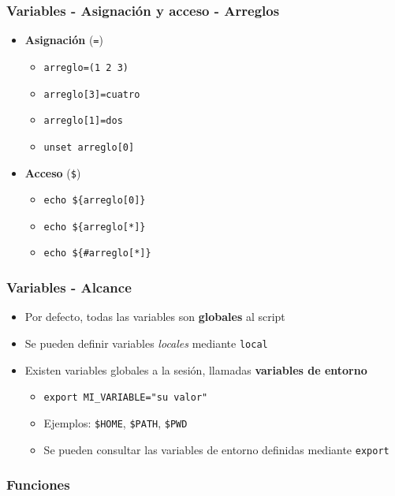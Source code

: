 \begin{frame}
  \frametitle{Variables - Asignación y acceso - Arreglos}
  \begin{itemize}
    \item \textbf{Asignación} (\texttt{=})
    \begin{itemize}
      \item \texttt{arreglo=(1 2 3)}
      \item \texttt{arreglo[3]=cuatro}
      \item \texttt{arreglo[1]=dos}
      \item \texttt{unset arreglo[0]}
    \end{itemize}
    \item \textbf{Acceso} (\texttt{\${}})
    \begin{itemize}
      \item \texttt{echo \$\{arreglo[0]\}}
      \item \texttt{echo \$\{arreglo[*]\}}
      \item \texttt{echo \$\{\#arreglo[*]\}}
    \end{itemize}
  \end{itemize}
\end{frame}

\begin{frame}
  \frametitle{Variables - Alcance}
  \begin{itemize}
    \item Por defecto, todas las variables son \textbf{globales} al script
    \item Se pueden definir variables \textit{locales} mediante \texttt{local}
    \item Existen variables globales a la sesión, llamadas \textbf{variables de entorno}
    \begin{itemize}
      \item \texttt{export MI\_VARIABLE=\string"su valor\string"}
      \item Ejemplos: \texttt{\$HOME}, \texttt{\$PATH}, \texttt{\$PWD}
      \item Se pueden consultar las variables de entorno definidas mediante \texttt{export}
    \end{itemize}
  \end{itemize}
\end{frame}

\subsubsection{Funciones}

